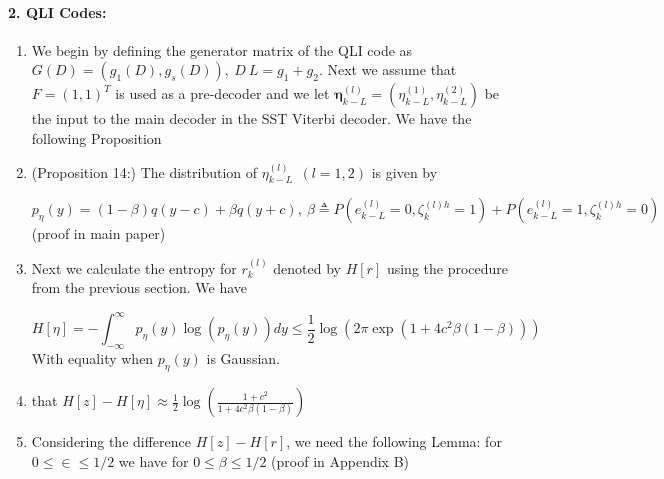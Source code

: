 \documentclass[fontsize=12pt]{article}
\theoremstyle{definition}
\begin{document}
\paragraph{2. QLI Codes:}
\begin{enumerate}
\item We begin by defining the generator matrix of the QLI code as  $G(D)=(g_1(D), g_s(D)),~D~L =g_1+g_2$. Next we assume that $F=(1,1)^T$ is used as a pre-decoder and we let $\mathbf{\eta}_{k-L}^{(l)} =({\eta}_{k-L}^{(1)},{\eta}_{k-L}^{(2)})$ be the input to the main decoder in the SST Viterbi decoder. We have the following Proposition

\item (Proposition 14:) The distribution of ${\eta}_{k-L}^{(l)}~~(l=1,2)$ is given by

\begin{equation}
p_{\eta}(y) = (1-\beta)q(y-c) + \beta q(y+c),~ \beta \triangleq P(e_{k-L}^{(l)} = 0, \zeta_k^{(l)h} =1) + P(e_{k-L}^{(l)} = 1, \zeta_k^{(l)h} =0)
\end{equation}
(proof in main paper)

\item Next we calculate the entropy for $r_k^{(l)} 
$ denoted by $H[r]$ using the procedure from the previous section. We have  

\begin{equation}
H[\eta] = -\int_{-\infty}^{\infty} p_\eta(y)\log(p_\eta(y)) dy \leq \frac{1}{2} \log(2\pi \exp(1+4c^2\beta(1-\beta)))
\end{equation}
With equality when $p_\eta(y) $ is Gaussian.

\item that $H[z]-H[\eta] \approx \frac{1}{2} \log\left(\frac{1+c^2}{1+4c^2\beta(1-\beta)}\right)$ 

\item Considering the difference $H[z] - H[r]$, we need the following Lemma: 
for $0\leq \in \leq 1/2$ we have for $0\leq \beta\leq 1/2$ (proof in Appendix B)
\end{enumerate}
\end{document}

